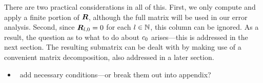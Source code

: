 There are two practical considerations in all of this. First, we only
compute and apply a finite portion of $\boldsymbol{R}$, although the full
matrix will be used in our error analysis. Second, since
$\boldsymbol{R}_{l,0} = 0$ for each $l\in\mathbb{N}$, this column can be ignored. As a
result, the question as to what to do about ${c}_{0}$
arises---this is addressed in the next section. The resulting
submatrix can be dealt with by making use of a convenient matrix
decomposition, also addressed in a later section.

\begin{itemize}
\item \TODO\ add necessary conditions---or break them out into
  appendix?
\end{itemize}

